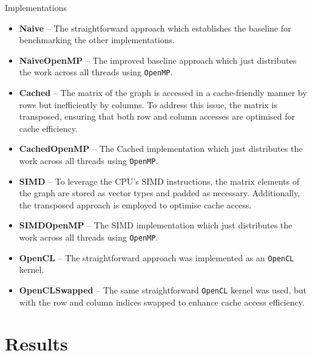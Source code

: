 \documentclass[british, svgnames, dvipsnames]{upb-beamer}
\begin{document}
\begin{frame}{Implementations}
    \begin{itemize}
        \pause
        \item \textbf{Naive} -- The straightforward approach which establishes the baseline for benchmarking the other implementations.
        \pause
        \item \textbf{NaiveOpenMP} -- The improved baseline approach which just distributes the work across all threads using \texttt{OpenMP}.
        \pause
        \item \textbf{Cached} -- The matrix of the graph is accessed in a cache-friendly manner by rows but inefficiently by columns. To address this issue, the matrix is transposed, ensuring that both row and column accesses are optimised for cache efficiency.
        \pause
        \item \textbf{CachedOpenMP} -- The Cached implementation which just distributes the work across all threads using \texttt{OpenMP}.
        \pause
        \item \textbf{SIMD} -- To leverage the CPU's SIMD instructions, the matrix elements of the graph are stored as vector types and padded as necessary. Additionally, the transposed approach is employed to optimise cache access.
        \pause
        \item \textbf{SIMDOpenMP} -- The SIMD implementation which just distributes the work across all threads using \texttt{OpenMP}.
        \pause
        \item \textbf{OpenCL} -- The straightforward approach was implemented as an \texttt{OpenCL} kernel.
        \pause
        \item \textbf{OpenCLSwapped} -- The same straightforward \texttt{OpenCL} kernel was used, but with the row and column indices swapped to enhance cache access efficiency.
    \end{itemize}
\end{frame}

\section{Results}
\end{document}
